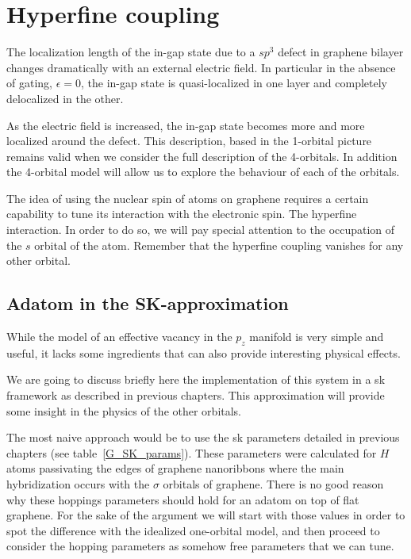 \chapter{Hyperfine coupling}
\label{ch:hyperfine}
The localization length of the in-gap state due to a $sp^3$ defect in graphene bilayer changes dramatically with an external electric field. In particular in the absence of gating, $\epsilon=0$, the in-gap state is quasi-localized in one layer and completely delocalized in the other.

As the electric field is increased, the in-gap state becomes more and more localized around the defect. This description, based in the 1-orbital picture remains valid when we consider the full description of the 4-orbitals. In addition the 4-orbital model will allow us to explore the behaviour of each of the orbitals.

The idea of using the nuclear spin of  atoms on graphene requires a certain capability to tune its interaction with the electronic spin. The hyperfine interaction. In order to do so, we will pay special attention to the occupation of the $s$ orbital of the  atom. Remember that the hyperfine coupling vanishes for any other orbital.



\section{Adatom in the SK-approximation}
While the model of an effective vacancy in the $p_z$ manifold is very simple and useful, it lacks some ingredients that can also provide interesting physical effects.

We are going to discuss briefly here the implementation of this system in a \ac{sk} framework as described in previous chapters. This approximation will provide some insight in the physics of the other orbitals.


The most naive approach would be to use the \ac{sk} parameters detailed in previous chapters (see table~\ref{G_SK_params}). These parameters were calculated for $H$ atoms passivating the edges of graphene nanoribbons\cite{Gosalbez-Martinez2011} where the main hybridization occurs with the $\sigma$ orbitals of graphene. There is no good reason why these hoppings parameters should hold for an adatom on top of flat graphene. For the sake of the argument we will start with those values in order to spot the difference with the idealized one-orbital model, and then proceed to consider the hopping parameters as somehow free parameters that we can tune.


